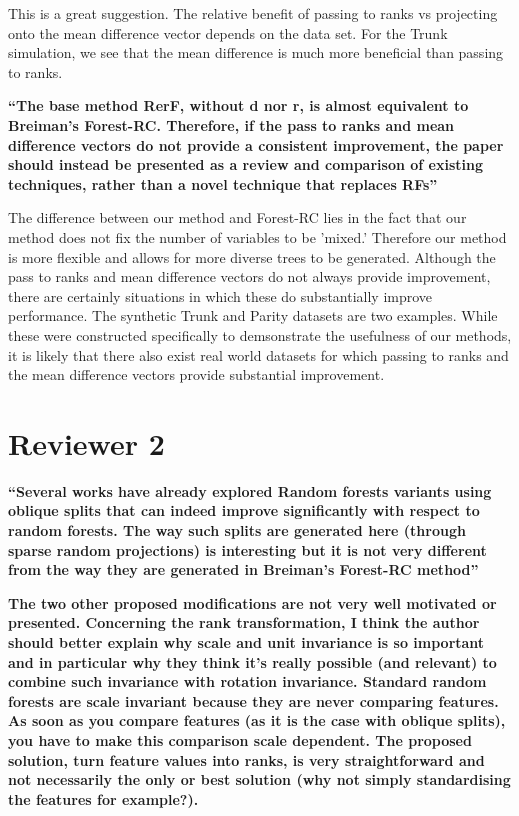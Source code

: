 This is a great suggestion. The relative benefit of passing to ranks vs projecting onto the mean difference vector depends on the data set. For the Trunk simulation, we see that the mean difference is much more beneficial than passing to ranks.

\textbf{``The base method RerF, without d nor r, is almost equivalent to Breiman's Forest-RC. Therefore, if the pass to ranks and mean difference vectors do not provide a consistent improvement, the paper should instead be presented as a review and comparison of existing techniques, rather than a novel technique that replaces RFs''}

The difference between our method and Forest-RC lies in the fact that our method does not fix the number of variables to be 'mixed.' Therefore our method is more flexible and allows for more diverse trees to be generated. Although the pass to ranks and mean difference vectors do not always provide improvement, there are certainly situations in which these do substantially improve performance. The synthetic Trunk and Parity datasets are two examples. While these were constructed specifically to demsonstrate the usefulness of our methods, it is likely that there also exist real world datasets for which passing to ranks and the mean difference vectors provide substantial improvement.

\section{Reviewer 2}

\textbf{``Several works have already explored Random forests variants using oblique splits that can indeed improve significantly with respect to random forests. The way such splits are generated here (through sparse random projections) is interesting but it is not very different from the way they are generated in Breiman’s Forest-RC method''}

\textbf{The two other proposed modifications are not very well motivated or presented. Concerning the rank transformation, I think the author should better explain why scale and unit invariance is so important and in particular why they think it’s really possible (and relevant) to combine such invariance with rotation invariance. Standard random forests are scale invariant because they are never comparing features. As soon as you compare features (as it is the case with oblique splits), you have to make this comparison scale dependent. The proposed solution, turn feature values into ranks, is very straightforward and not necessarily the only or best solution (why not simply standardising the features for example?).}

